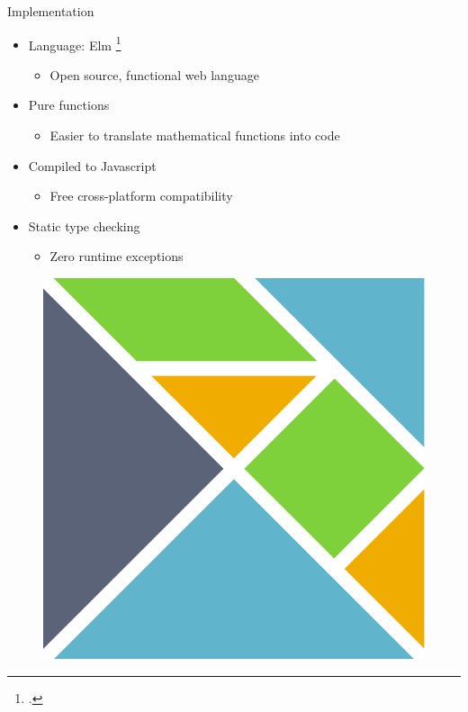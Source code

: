 \documentclass[aspectratio=169]{beamer}
\begin{document}
\begin{frame}[c]{Implementation}
    \begin{multicols}{2}
        \begin{itemize}
            \item<1-> Language: Elm \footcite{czaplicki_asynchronous_2013}
            \begin{itemize}
                \item Open source, functional web language
            \end{itemize}
            \item<2-> Pure functions
            \begin{itemize}
                \item Easier to translate mathematical functions into code
            \end{itemize}
            \item<3-> Compiled to Javascript
            \begin{itemize}
                \item Free cross-platform compatibility
            \end{itemize}
            \item<4-> Static type checking
            \begin{itemize}
                \item Zero runtime exceptions
            \end{itemize}
        \end{itemize}
        \columnbreak
        \begin{figure}
            \centering
            \includegraphics[width=.5\linewidth]{images/Elm_logo.pdf}
        \end{figure}
    \end{multicols}
\end{frame}
\end{document}
